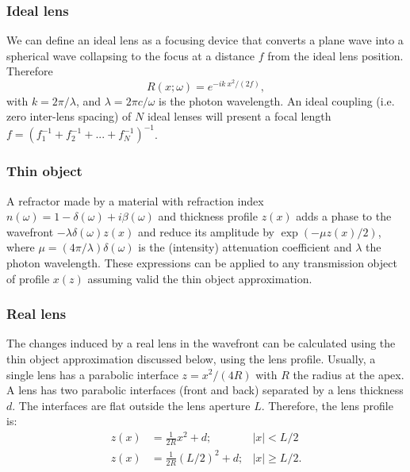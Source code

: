 \documentclass{iucr}              %
\begin{document}
\subsubsection{Ideal lens}
We can define an ideal lens as a focusing device that converts a plane wave into a spherical wave collapsing to the focus at a distance $f$ from the ideal lens position. Therefore
\begin{equation}
    R(x;\omega) = e^{-i k~x^2/(2 f)},
\end{equation}
with $k=2\pi/\lambda$, and $\lambda=2\pi c/\omega$ is the photon wavelength. 
An ideal coupling (i.e. zero inter-lens spacing) of $N$ ideal lenses will present a focal length $f=(f_1^{-1}+f_2^{-1}+...+f_N^{-1})^{-1}$. 

\subsubsection{Thin object} A refractor made by a material with refraction index $n(\omega)=1-\delta(\omega)+i\beta(\omega)$ 
and thickness profile $z(x)$ adds a phase to the wavefront $-\lambda \delta(\omega) z(x)$ and reduce its amplitude by $\exp(-\mu z(x)/2)$, where $\mu=(4 \pi/\lambda) \delta(\omega)$ is the (intensity) attenuation coefficient and $\lambda$ the photon wavelength. These expressions can be applied to any transmission object of profile $x(z)$ assuming valid the thin object approximation. 


\subsubsection{Real lens} The changes induced by a real lens in the wavefront can be calculated using the thin object approximation discussed below, using the lens profile. Usually, a single lens has a parabolic interface $z=x^2/(4R)$ with $R$ the radius at the apex. A lens has two parabolic interfaces (front and back) separated by a lens thickness $d$. The interfaces are flat outside the lens aperture $L$. Therefore, the lens profile is:
\begin{align}
    z(x) &= \frac{1}{2R} x^2 + d; & |x| < L/2\\ \nonumber
    z(x) &= \frac{1}{2R} (L/2)^2 + d; & |x| \ge L/2.
\end{align}
\end{document}
